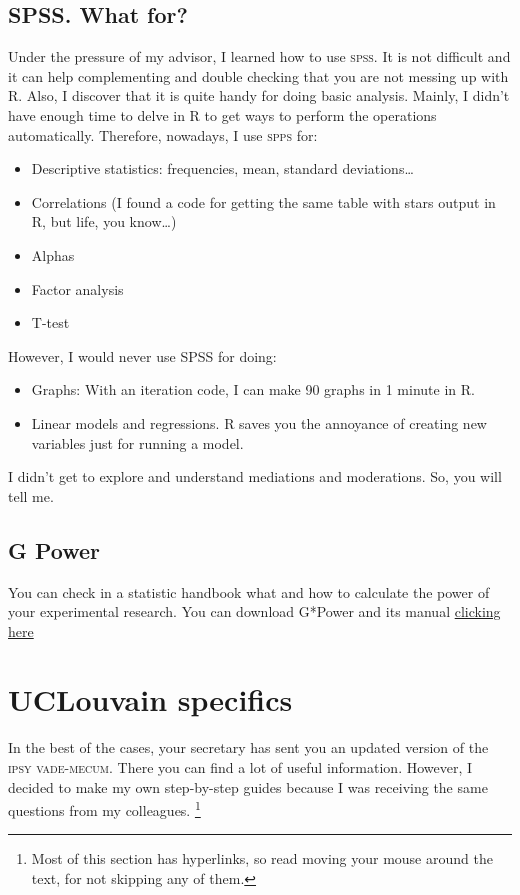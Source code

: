 \documentclass{article}
\begin{document}
\subsection{SPSS. What for?}
\label{subsec: SPSS}
Under the pressure of my advisor, I learned how to use \textsc{spss}. It is not difficult and it can help complementing and double checking that you are not messing up with R. Also, I discover that it is quite handy for doing basic analysis. Mainly, I didn't have enough time to delve in R to get ways to perform the operations automatically. Therefore, nowadays, I use \textsc{spps} for: 
\begin{itemize}
    \item Descriptive statistics: frequencies, mean, standard deviations…
    \item Correlations (I found a code for getting the same table with stars output in R, but life, you know…)
    \item Alphas
    \item Factor analysis
    \item T-test
\end{itemize}
\begin{flushleft}
However, I would never use SPSS for doing:
\end{flushleft}
\begin{itemize}
    \item Graphs: With an iteration code, I can make 90 graphs in 1 minute in R.
    \item Linear models and regressions. R saves you the annoyance of creating new variables just for running a model.
\end{itemize}
\begin{flushleft}
I didn't get to explore and understand mediations and moderations. So, you will tell me.
\end{flushleft}


\subsection{G Power}
\label{subsec: G Power}
You can check in a statistic handbook what and how to calculate the power of your experimental research. You can download G*Power and its manual \href{http://www.psychologie.hhu.de/arbeitsgruppen/allgemeine-psychologie-und-arbeitspsychologie/gpower.html}{clicking here}  

\section{UCLouvain specifics}
\label{sec: UCLouvain}
In the best of the cases, your secretary has sent you an updated version of the \textsc{ipsy vade-mecum}. There you can find a lot of useful information. However, I decided to make my own step-by-step guides because I was receiving the same questions from my colleagues. \footnote{Most of this section has hyperlinks, so read moving your mouse around the text, for not skipping any of them.}
\end{document}

